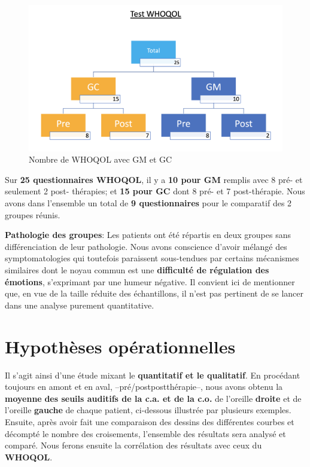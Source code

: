      \begin{figure}
     \centering
     \includegraphics[width=1\linewidth]{images/graphiques/TestWQ.png}
     \caption{Nombre de WHOQOL avec GM et GC}
\end{figure}


Sur \textbf{25 questionnaires WHOQOL}, il y a \textbf{10 pour GM} remplis
avec 8 pré- et seulement 2
     post- thérapies; et \textbf{15 pour GC} dont 8 pré-
     et 7 post-thérapie.
      Nous avons dans l'ensemble un total de \textbf{9 questionnaires} pour le
     comparatif des 2 groupes réunis.


\textbf{ Pathologie des groupes}: Les patients ont été répartis en deux groupes sans différenciation de
 leur pathologie. Nous avons conscience d'avoir mélangé des symptomatologies qui
 toutefois paraissent
 sous-tendues par
                                               certains mécanismes
                                               similaires dont le
                                               noyau commun est une
                                              \textbf{difficulté de
                                               régulation des
                                               émotions},
                                               s'exprimant par une
                                               humeur négative.
                                               Il convient ici de mentionner que, en vue de la taille réduite des échantillons, il n'est pas
pertinent de se lancer dans une analyse purement
quantitative.

\section{Hypothèses opérationnelles}

Il s'agit ainsi d'une étude mixant le \textbf{quantitatif  et le
  qualitatif}.
En procédant toujours en amont et en aval, --pré/postpostthérapie--, nous
avons obtenu la \textbf{moyenne} \textbf{des seuils
auditifs de la c.a. et de la c.o.} de l'oreille \textbf{droite} et de
l'oreille \textbf{gauche} de chaque patient, ci-dessous illustrée par
plusieurs exemples. Ensuite, après avoir
fait une comparaison des dessins des différentes courbes et
décompté le nombre des croisements, l'ensemble des résultats sera analysé et comparé.
Nous ferons ensuite la corrélation des résultats avec ceux du\textbf{
  WHOQOL}.

